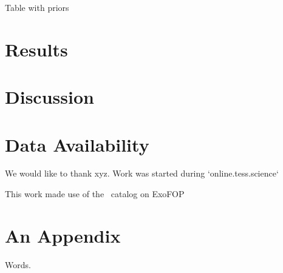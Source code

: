 \documentclass[modern]{aastex63}
\begin{document}
Table with priors

%
%
%
%





\section{Results}

\section{Discussion}

\section{Data Availability}



\acknowledgments

We would like to thank xyz. 
Work was started during `online.tess.science`



This work made use of the \tess\ catalog on ExoFOP

\vspace{5mm}


\appendix

\section{An Appendix}

Words.

{}

\end{document}
